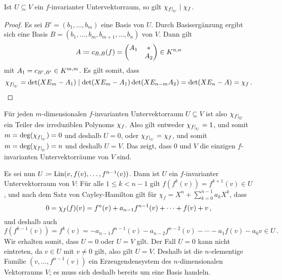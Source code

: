 \begin{lemma}
  Ist $U \subseteq V$ ein $f$-invarianter Untervektorraum, so gilt $\charpoly{\restrict{f}{U}} \divides \charpoly{f}$.
\end{lemma}

\begin{proof}
  Es sei $B' = (b_1, \dotsc, b_m)$ eine Basis von $U$.
  Durch Basisergänzung ergibt sich eine Basis $B = (b_1, \dotsc, b_m, b_{m+1}, \dotsc, b_n)$ von $V$.
  Dann gilt
  \[
              A
    \defined  c_{B,B}(f)
    =         \begin{pmatrix}
                A_1 & *   \\
                    & A_2
              \end{pmatrix}
    \in       \matrices{n}{K}
  \]
  mit $A_1 = c_{B',B'} \in \matrices{m}{K}$.
  Es gilt somit, dass
  \[
              \charpoly{\restrict{f}{U}}
    =         \det(X E_m - A_1)
    \divides  \det(X E_m - A_1) \det(X E_{n-m} A_2)
    =         \det(X E_n - A)
    =         \charpoly{f} \,.
  \]
\end{proof}

Für jeden $m$-dimensionalen $f$-invarianten Untervektorraum $U \subseteq V$ ist also $\charpoly{\restrict{f}{U}}$ ein Teiler des irreduziblen Polynoms $\charpoly{f}$.
Also gilt entweder $\charpoly{\restrict{f}{U}} = 1$, und somit $m = \deg(\charpoly{\restrict{f}{U}}) = 0$ und deshalb $U = 0$, oder $\charpoly{\restrict{f}{U}} = \charpoly{f}$, und somit $m = \deg(\charpoly{\restrict{f}{U}}) = n$ und deshalb $U = V$.
Das zeigt, dass $0$ und $V$ die einzigen $f$-invarianten Untervektorräume von $V$ sind.

Es sei nun $U \defined \Lin(v, f(v), \dotsc, f^{n-1}(v))$.
Dann ist $U$ ein $f$-invarianter Untervektorraum von $V$:
Für alle $1 \leq k < n-1$ gilt $f(f^k(v)) = f^{k+1}(v) \in U$, und nach dem Satz von Cayley-Hamilton gilt für $\chi_f = X^n + \sum_{k=0}^{n-1} a_k X^k$, dass
\[
    0
  = \charpoly{f}(f)(v)
  = f^n(v) + a_{n-1} f^{n-1}(v) + \dotsb + f(v) + v \,,
\]
und deshalb auch
\[
    f(f^{k-1}(v))
  = f^k(v)
  = - a_{n-1} f^{n-1}(v) - a_{n-2} f^{n-2}(v) - \dotsb - a_1 f(v) - a_0 v
  \in U \,.
\]
Wir erhalten somit, dass $U = 0$ oder $U = V$ gilt.
Der Fall $U = 0$ kann nicht eintreten, da $v \in U$ mit $v \neq 0$ gilt, also gilt $U = V$.
Deshalb ist die $n$-elementige Familie $(v, \dotsc, f^{n-1}(v))$ ein Erzeugendensystem des $n$-dimensionalen Vektorraums $V$;
es muss sich deshalb bereits um eine Basis handeln.





